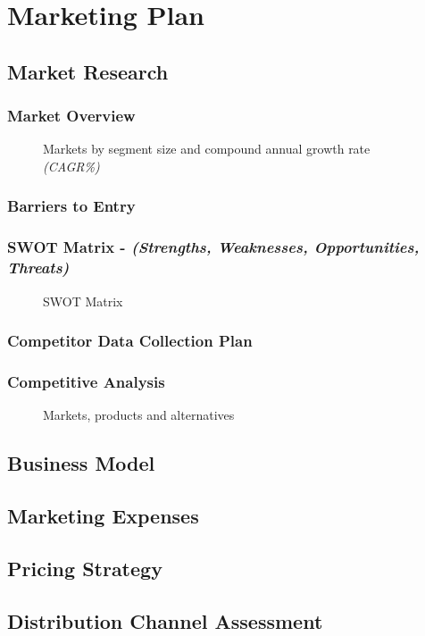 \section{Marketing Plan}
\subsection{Market Research}
\subsubsection{Market Overview}
\begin{figure}[H]
	\centering
	
	\label{fig:cagr}
	\caption{Markets by segment size and compound annual growth rate \textit{(CAGR\%)}}
\end{figure}
\subsubsection{Barriers to Entry}
\subsubsection{SWOT Matrix - \emph{(Strengths, Weaknesses, Opportunities, Threats)}}
\begin{figure}[H]
	\centering
	
	\label{fig:swot}
	\caption{SWOT Matrix}
\end{figure}
\newpage
\subsubsection{Competitor Data Collection Plan}

\subsubsection{Competitive Analysis}
\begin{figure}[H]
	\centering
	
	\label{fig:timber}
	\caption{Markets, products and alternatives}
\end{figure}

\subsection{Business Model}
\subsection{Marketing Expenses}
\subsection{Pricing Strategy}
\subsection{Distribution Channel Assessment}